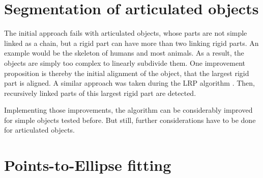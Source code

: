 

\section{Segmentation of articulated objects}
The initial approach fails with articulated objects, whose parts are not simple linked as a chain, but a rigid part can have more than two linking rigid parts. An example would be the skeleton of humans and most animals. As a result, the objects are simply too complex to linearly subdivide them.
One improvement proposition is thereby the initial alignment of the object, that the largest rigid part is aligned.  A similar approach was taken during the LRP algorithm \cite{guo2016correspondence}. Then, recursively linked parts of this largest rigid part are detected. 

Implementing those improvements, the algorithm can be considerably improved for simple objects tested before. But still, further considerations have to be done for articulated objects.


\section{Points-to-Ellipse fitting}

